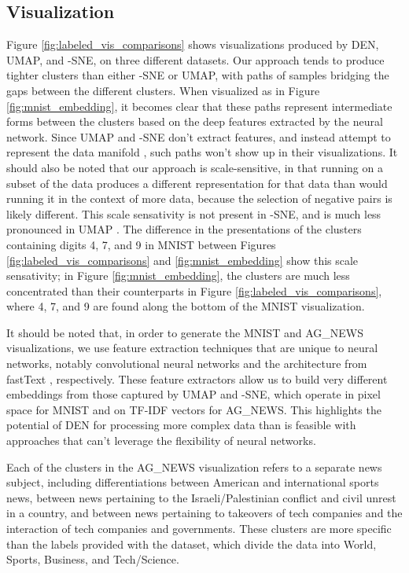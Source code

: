 \documentclass{article}
\begin{document}
\subsection{Visualization}



Figure \ref{fig:labeled_vis_comparisons} shows visualizations produced by DEN, UMAP, and -SNE, on three different datasets. Our approach tends to produce tighter clusters than either -SNE or UMAP, with paths of samples bridging the gaps between the different clusters. When visualized as in Figure \ref{fig:mnist_embedding}, it becomes clear that these paths represent intermediate forms between the clusters based on the deep features extracted by the neural network. Since UMAP and -SNE don't extract features, and instead attempt to represent the data manifold \cite{maaten2008visualizing, 2018arXivUMAP}, such paths won't show up in their visualizations. It should also be noted that our approach is scale-sensitive, in that running on a subset of the data produces a different representation for that data than would running it in the context of more data, because the selection of negative pairs is likely different. This scale sensativity is not present in -SNE, and is much less pronounced in UMAP \cite{maaten2008visualizing, 2018arXivUMAP}. The difference in the presentations of the clusters containing digits 4, 7, and 9 in MNIST between Figures \ref{fig:labeled_vis_comparisons} and \ref{fig:mnist_embedding} show this scale sensativity; in Figure \ref{fig:mnist_embedding}, the clusters are much less concentrated than their counterparts in Figure \ref{fig:labeled_vis_comparisons}, where 4, 7, and 9 are found along the bottom of the MNIST visualization.

It should be noted that, in order to generate the MNIST and AG\_NEWS visualizations, we use feature extraction techniques that are unique to neural networks, notably convolutional neural networks and the architecture from fastText \cite{joulin2016bag}, respectively. These feature extractors allow us to build very different embeddings from those captured by UMAP and -SNE, which operate in pixel space for MNIST and on TF-IDF vectors for AG\_NEWS. This highlights the potential of DEN for processing more complex data than is feasible with approaches that can't leverage the flexibility of neural networks. 

Each of the clusters in the AG\_NEWS visualization refers to a separate news subject, including differentiations between American and international sports news, between news pertaining to the Israeli/Palestinian conflict and civil unrest in a country, and between news pertaining to takeovers of tech companies and the interaction of tech companies and governments. These clusters are more specific than the labels provided with the dataset, which divide the data into World, Sports, Business, and Tech/Science.
\end{document}

